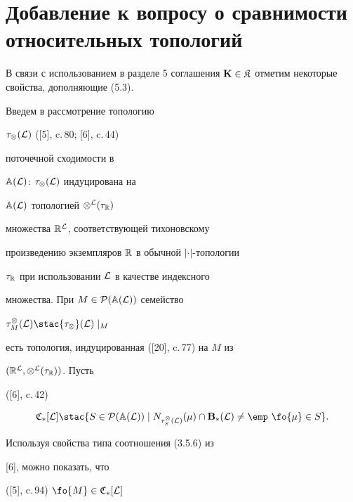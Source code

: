 \section{Добавление к вопросу о сравнимости относительных топологий}





В связи с использованием в разделе 5 соглашения ${\bold K} \in


{\frak K}$ отметим некоторые свойства, дополняющие (5.3).


Введем в рассмотрение топологию


${{\tau}_\otimes}({\cal L})$ ([5], c.\,80; [6], c.\,44)


поточечной сходимости в


${\Bbb A}({\cal L})$: ${{\tau}_\otimes}({\cal L})$ индуцирована на


${\Bbb A}({\cal L})$ топологией ${{\otimes}^{\cal L}}({\tau}_{\Bbb R})$


множества ${{\Bbb R}^{\cal L}}$, соответствующей тихоновскому


произведению экземпляров ${\Bbb R}$ в обычной $|\cdot|$-топологии


${\tau}_{\Bbb R}$ при использовании ${\cal L}$ в качестве индексного


множества. При $M \in {\cal P}({\Bbb A}({\cal L}))$ семейство


${{\tau}_M^\otimes}({\cal L}) \stac {{\tau}_\otimes}({\cal L})\mid_M$


есть топология, индуцированная ([20], c.\,77) на $M$ из


$({{\Bbb R}^{\cal L}},{{\otimes}^{\cal L}}({\tau}_{\Bbb R}))$. Пусть


([6], c.\,42)


$$


{{\frak C}_*}[{\cal L}] \stac \{S \in {\cal P}({\Bbb A}({\cal L})) \mid


{N_{{{\tau}_S^\otimes}({\cal L})}}(\mu) \cap {{\bold B}_*}({\cal


L}) \ne \emp


\ \fo{\mu} \in S\}.


$$





Используя свойства типа соотношения (3.5.6) из


[6], можно показать, что


([5], c.\,94) $\fo{M} \in {{\frak C}_*}[{\cal L}]$


$$


